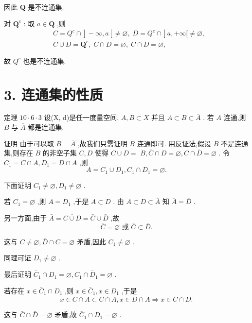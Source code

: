 因此 $\mathbf{Q}$ 是不连通集.

对 ${\mathbf{Q}}^{c}$ : 取 $a \in  \mathbf{Q}$ ,则
\begin{align*}
	&\left. {C = {Q}^{c} \cap  }\right\rbrack   - \infty ,a\left\lbrack  { \neq  \varnothing ,\;D = {Q}^{c} \cap  }\right\rbrack  a, + \infty \lbrack  \neq  \varnothing ,\\
	&C \cup  D = {\mathbf{Q}}^{c},\;C \cap  D = \varnothing ,\;C \cap  D = \varnothing ,
\end{align*}

故 ${Q}^{c}$ 也是不连通集.

\section*{3. 连通集的性质}

定理 ${10} \cdot  6 \cdot  3$ 设(X, d)是任一度量空间, $A,B \subset  X$ 并且 $A \subset  B \subset  \overline{A}$ . 若 $A$ 连通,则 $B$ 与 $\overline{A}$ 都是连通集.

证明 由于可以取 $B = \bar{A}$ ,故我们只需证明 $B$ 连通即可. 用反证法,假设 $B$ 不是连通集,则存在 $B$ 的非空子集 $C,D$ 使得 $C \cup  D =$  $B,\bar{C} \cap  D = \varnothing ,C \cap  \bar{D} = \varnothing$ . 令 ${C}_{1} = C \cap  A,{D}_{1} = D \cap  A$ ,则
$$A = {C}_{1} \cup  {D}_{1},{C}_{1} \cap  {D}_{1} = \varnothing .$$

下面证明 ${C}_{1} \neq  \varnothing ,{D}_{1} \neq  \varnothing$ .

若 ${C}_{1} = \varnothing$ ,则 $A = {D}_{1}$ ,于是 $A \subset  D$ . 由 $A \subset  D \subset  \overline{A}$ 知 $\overline{A} = \overline{D}$ .

另一方面,由于 $\bar{A} = \overline{C \cup  D} = \bar{C} \cup  \bar{D}$ ,故
$$\bar{C} = \varnothing \text{ 或 }\bar{C} \subset  \bar{D}.$$

这与 $C \neq  \varnothing ,\bar{D} \cap  C = \varnothing$ 矛盾,因此 ${C}_{1} \neq  \varnothing$ .

同理可证 ${D}_{1} \neq  \varnothing$ .

最后证明 ${\bar{C}}_{1} \cap  {D}_{1} = \varnothing ,{C}_{1} \cap  {\bar{D}}_{1} = \varnothing$ .

若存在 $x \in  {\bar{C}}_{1} \cap  {D}_{1}$ ,则 $x \in  {\bar{C}}_{1},x \in  {D}_{1}$ ,于是
$$x \in  \overline{C \cap  A} \subset  \bar{C} \cap  \bar{A},x \in  D \cap  A \Rightarrow  x \in  \bar{C} \cap  D.$$

这与 $\bar{C} \cap  \bar{D} = \varnothing$ 矛盾,故 ${\bar{C}}_{1} \cap  {D}_{1} = \varnothing$ .

